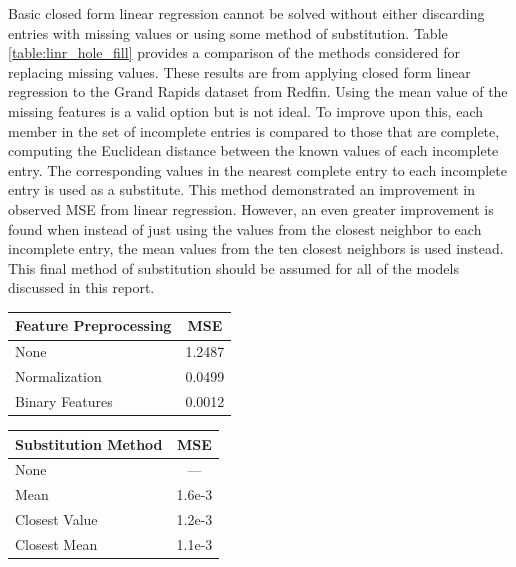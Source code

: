 \documentclass[10pt]{article}
\begin{document}
\begin{multicols}{2}
		Basic closed form linear regression cannot be solved without either discarding entries with missing values or using some method of substitution. Table \ref{table:linr_hole_fill} provides a comparison of the methods considered for replacing missing values. These results are from applying closed form linear regression to the Grand Rapids dataset from Redfin. Using the mean value of the missing features is a valid option but is not ideal. To improve upon this, each member in the set of incomplete entries is compared to those that are complete, computing the Euclidean distance between the known values of each incomplete entry. The corresponding values in the nearest complete entry to each incomplete entry is used as a substitute. This method demonstrated an improvement in observed MSE from linear regression. However, an even greater improvement is found when instead of just using the values from the closest neighbor to each incomplete entry, the mean values from the ten closest neighbors is used instead. This final method of substitution should be assumed for all of the models discussed in this report.
		\begin{center}
			\captionsetup{type=table}
			\begin{tabular}{l|c}
				Feature Preprocessing 	& MSE \\
				\hline
				None 					& 1.2487 \\
				Normalization 			& 0.0499 \\
				Binary Features 		& 0.0012 \\
			\end{tabular}
			\label{table:linr_preprocessing}			
		\end{center}

		\begin{center}
        	\captionsetup{type=table}
			\begin{tabular}{l|c}
				Substitution Method & MSE \\
				\hline
				None 				& ---\\
				Mean 				& 1.6e-3 \\
				Closest Value 		& 1.2e-3 \\
				Closest Mean 		& 1.1e-3 \\
			\end{tabular}
			\label{table:linr_hole_fill}
		\end{center}


\end{multicols}
\end{document}
